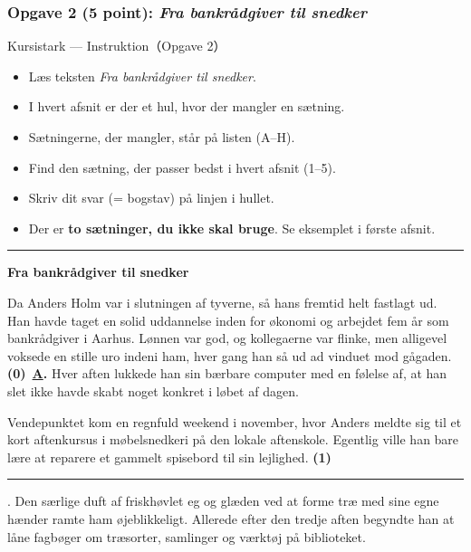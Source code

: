 \subsubsection*{Opgave 2 (5 point): \textit{Fra bankrådgiver til snedker}}

\begin{emailbox}{Kursistark --- Instruktion（Opgave 2）}
\begin{itemize}
  \item Læs teksten \textit{Fra bankrådgiver til snedker}.
  \item I hvert afsnit er der et hul, hvor der mangler en sætning.
  \item Sætningerne, der mangler, står på listen (A--H).
  \item Find den sætning, der passer bedst i hvert afsnit (1--5).
  \item Skriv dit svar (= bogstav) på linjen i hullet.
  \item Der er \textbf{to sætninger, du ikke skal bruge}. Se eksemplet i første afsnit.
\end{itemize}

\vspace{0.35em}
\hrule
\vspace{0.45em}

\textbf{\color{NCDNavy}Fra bankrådgiver til snedker}

\vspace{0.3em}
Da Anders Holm var i slutningen af tyverne, så hans fremtid helt fastlagt ud. Han havde taget en solid uddannelse inden for økonomi og arbejdet fem år som bankrådgiver i Aarhus. Lønnen var god, og kollegaerne var flinke, men alligevel voksede en stille uro indeni ham, hver gang han så ud ad vinduet mod gågaden. \textbf{(0)}\ \underline{\hspace{0.45cm}\textbf{A}\hspace{0.45cm}}\textbf{.} Hver aften lukkede han sin bærbare computer med en følelse af, at han slet ikke havde skabt noget konkret i løbet af dagen.

\vspace{0.25em}
Vendepunktet kom en regnfuld weekend i november, hvor Anders meldte sig til et kort aftenkursus i møbelsnedkeri på den lokale aftenskole. Egentlig ville han bare lære at reparere et gammelt spisebord til sin lejlighed. \textbf{(1)}\ \rule{1.8cm}{0.4pt}. Den særlige duft af friskhøvlet eg og glæden ved at forme træ med sine egne hænder ramte ham øjeblikkeligt. Allerede efter den tredje aften begyndte han at låne fagbøger om træsorter, samlinger og værktøj på biblioteket.


\end{emailbox}
